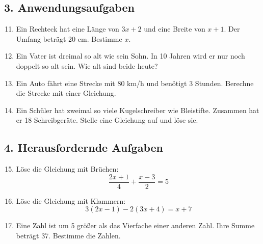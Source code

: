\subsection*{3. Anwendungsaufgaben}
\begin{enumerate}
    \setcounter{enumi}{10}
    \item Ein Rechteck hat eine Länge von \( 3x + 2 \) und eine Breite von \( x + 1 \). Der Umfang beträgt 20 cm. Bestimme \( x \).
    \item Ein Vater ist dreimal so alt wie sein Sohn. In 10 Jahren wird er nur noch doppelt so alt sein. Wie alt sind beide heute?
    \item Ein Auto fährt eine Strecke mit 80 km/h und benötigt 3 Stunden. Berechne die Strecke mit einer Gleichung.
    \item Ein Schüler hat zweimal so viele Kugelschreiber wie Bleistifte. Zusammen hat er 18 Schreibgeräte. Stelle eine Gleichung auf und löse sie.
\end{enumerate}

\subsection*{4. Herausfordernde Aufgaben}
\begin{enumerate}
    \setcounter{enumi}{14}
    \item Löse die Gleichung mit Brüchen:
    \[
        \frac{2x + 1}{4} + \frac{x - 3}{2} = 5
    \]
    \item Löse die Gleichung mit Klammern:
    \[
        3(2x - 1) - 2(3x + 4) = x + 7
    \]
    \item Eine Zahl ist um 5 größer als das Vierfache einer anderen Zahl. Ihre Summe beträgt 37. Bestimme die Zahlen.
\end{enumerate}